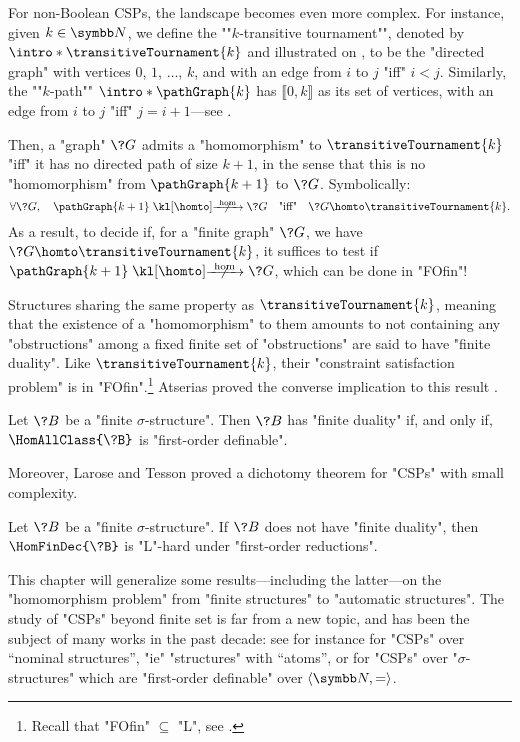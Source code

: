 For non-Boolean CSPs, the landscape becomes even more complex.
For instance, given $k\in\N$, we define the \AP""$k$-transitive tournament"", denoted
by \AP$\intro*\transitiveTournament{k}$ and illustrated on ,
to be the "directed graph" with vertices $0$, $1$, $\hdots$, $k$,
and with an edge from $i$ to $j$ "iff" $i < j$.
Similarly, the \AP""$k$-path"" \AP$\intro*\pathGraph{k}$ has $\lBrack 0,k\rBrack$ as
its set of vertices, with an edge from $i$ to $j$ "iff" $j = i + 1$---see .

Then, a "graph" $\?G$ admits a "homomorphism" to $\transitiveTournament{k}$ "iff"
it has no directed path of size $k+1$, in the sense that this is no "homomorphism"
from $\pathGraph{k+1}$ to $\?G$. Symbolically:
\[
	\forall \?G,\quad
	\pathGraph{k+1} \nothomto \?G
	\quad\text{"iff"}\quad
	\?G \homto \transitiveTournament{k}.
\]
As a result, to decide if, for a "finite graph" $\?G$, we have
$\?G \homto \transitiveTournament{k}$, it suffices
to test if $\pathGraph{k+1} \nothomto \?G$, which can be done in "FOfin"!

Structures sharing the same property as $\transitiveTournament{k}$, meaning that
the existence of a "homomorphism" to them amounts to not containing any "obstructions"
among a fixed finite set of "obstructions" are said to have "finite duality".
Like $\transitiveTournament{k}$, their "constraint satisfaction problem"
is in "FOfin".\footnote{Recall that "FOfin" $\subseteq$ "L", see .}
Atserias proved the converse implication to this result \cite[Corollary 4]{Atserias2008DigraphColoring}.

\AP\begin{proposition}
	Let $\?B$ be a "finite $\sigma$-structure". Then $\?B$ has "finite duality"
	if, and only if, $\HomAllClass{\?B}$ is "first-order definable".
\end{proposition}

Moreover, Larose and Tesson proved a dichotomy theorem for "CSPs" with small complexity.
\begin{proposition}
	Let $\?B$ be a "finite $\sigma$-structure". If $\?B$ does not have "finite duality",
	then $\HomFinDec{\?B}$ is "L"-hard under "first-order reductions".
\end{proposition}

This chapter will generalize some results---including the latter---on the "homomorphism problem"
from "finite structures" to "automatic structures". The study of "CSPs" beyond finite set
is far from a new topic, and has been the subject of many works in the past decade:
see for instance \cite{KlinKopczynskiOchremiakTorunczyk2015LocallyFiniteCSP} for "CSPs"
over ``nominal structures'', "ie" "structures" with ``atoms'',
or \cite{KlinLasotaOchremiakTorunczyk2016HomomorphismProblems} for "CSPs" over
"$\sigma$-structures" which are "first-order definable" over $\tup{\N,{=}}$.


